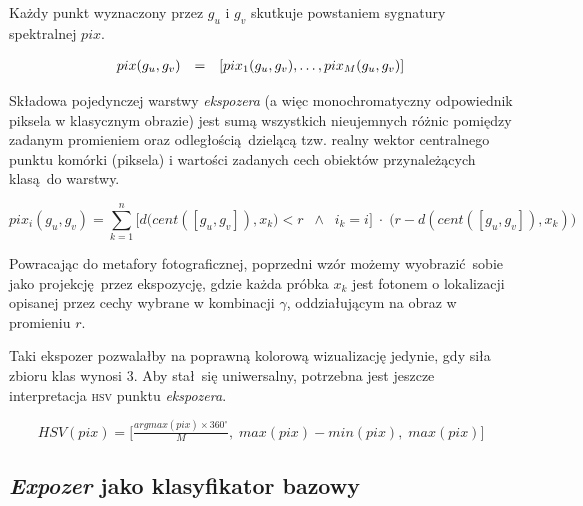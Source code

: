 \documentclass[]{article}
\begin{document}
Każdy punkt wyznaczony przez $g_u$ i $g_v$ skutkuje powstaniem sygnatury spektralnej $pix$.

\begin{equation}
	\begin{array}[b]{lll}
		pix(g_u,g_v) &=& [pix_1(g_u,g_v), \ldots, pix_M(g_u,g_v)]
	\end{array}
\end{equation}

Składowa pojedynczej warstwy \emph{ekspozera} (a więc monochromatyczny odpowiednik piksela w klasycznym obrazie) jest sumą wszystkich nieujemnych różnic pomiędzy zadanym promieniem oraz odległością dzielącą tzw. realny wektor centralnego punktu komórki (piksela) i wartości zadanych cech obiektów przynależących klasą do warstwy.



\begin{equation}
	pix_i(g_u,g_v) = \sum_{k=1}^{n}\Big[d\Big(cent([g_u,g_v]),x_k\Big) < r \;\;\wedge\;\; i_k = i\Big]\;\cdot\; \Big(r - d(cent([g_u,g_v]),x_k)\Big)
\end{equation}

Powracając do metafory fotograficznej, poprzedni wzór możemy wyobrazić sobie jako projekcję przez ekspozycję, gdzie każda próbka $x_k$ jest fotonem o lokalizacji opisanej przez cechy wybrane w kombinacji $\gamma$, oddziałującym na obraz w promieniu $r$.

Taki ekspozer pozwalałby na poprawną kolorową wizualizację jedynie, gdy siła zbioru klas wynosi 3. Aby stał się uniwersalny, potrzebna jest jeszcze interpretacja \textsc{hsv} punktu \emph{ekspozera}.

\begin{equation}
	HSV(pix) = \Big[\tfrac{argmax(pix) \times 360^\circ}{M},\;max(pix) - min(pix),\;max(pix)\Big] 
\end{equation}


\subsection{\emph{Expozer} jako klasyfikator bazowy}
\label{exposerclassifier}
\end{document}
